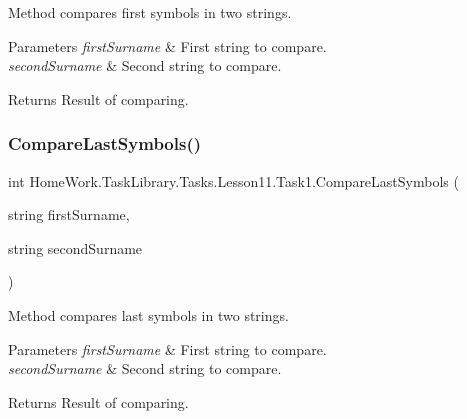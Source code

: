 Method compares first symbols in two strings. 


\begin{DoxyParams}{Parameters}
{\em first\+Surname} & First string to compare.\\
\hline
{\em second\+Surname} & Second string to compare.\\
\hline
\end{DoxyParams}
\begin{DoxyReturn}{Returns}
Result of comparing.
\end{DoxyReturn}
\mbox{\label{class_home_work_1_1_task_library_1_1_tasks_1_1_lesson11_1_1_task1_a7213794b9fd45551fe75d58fd6ac9a02}} 
\subsubsection{\texorpdfstring{CompareLastSymbols()}{CompareLastSymbols()}}
{\footnotesize\ttfamily int Home\+Work.\+Task\+Library.\+Tasks.\+Lesson11.\+Task1.\+Compare\+Last\+Symbols (\begin{DoxyParamCaption}\item[{string}]{first\+Surname,  }\item[{string}]{second\+Surname }\end{DoxyParamCaption})\hspace{0.3cm}{\ttfamily [private]}}



Method compares last symbols in two strings. 


\begin{DoxyParams}{Parameters}
{\em first\+Surname} & First string to compare.\\
\hline
{\em second\+Surname} & Second string to compare.\\
\hline
\end{DoxyParams}
\begin{DoxyReturn}{Returns}
Result of comparing.
\end{DoxyReturn}
\mbox{\label{class_home_work_1_1_task_library_1_1_tasks_1_1_lesson11_1_1_task1_ac62a01c5dce93804a5a785f1b7ecab57}} 
